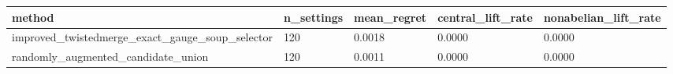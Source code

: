 \begin{tabular}{lllll}
\toprule
method & n_settings & mean_regret & central_lift_rate & nonabelian_lift_rate\\
\midrule
improved\_twistedmerge\_exact\_gauge\_soup\_selector & 120 & 0.0018 & 0.0000 & 0.0000\\
randomly\_augmented\_candidate\_union & 120 & 0.0011 & 0.0000 & 0.0000\\
\bottomrule
\end{tabular}
